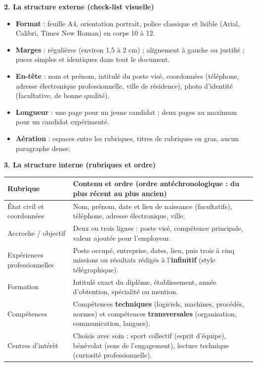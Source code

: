 \documentclass[11pt]{article}
\newcommand{\cle}[1]{{\popxbold\color{popdark}#1}}
\begin{document}
\textbf{2. La structure externe (check-list visuelle)}\par
\begin{itemize}
    \item \textbf{Format} : feuille A4, orientation portrait, police classique et lisible (Arial, Calibri, Times New Roman) en corps 10 à 12.
    \item \textbf{Marges} : régulières (environ 1,5 à 2 cm) ; alignement à gauche ou justifié ; puces simples et identiques dans tout le document.
    \item \textbf{En-tête} : nom et prénom, intitulé du poste visé, coordonnées (téléphone, adresse électronique professionnelle, ville de résidence), photo d'identité (facultative, de bonne qualité).
    \item \textbf{Longueur} : une page pour un jeune candidat ; deux pages au maximum pour un candidat expérimenté.
    \item \textbf{Aération} : espaces entre les rubriques, titres de rubriques en gras, aucun paragraphe dense.
\end{itemize}

\textbf{3. La structure interne (rubriques et ordre)}\par
\begin{center}
\begin{tabularx}{\linewidth}{|l|X|}\hline
\rowcolor{popblueL}
\textbf{Rubrique} & \textbf{Contenu et ordre (ordre antéchronologique : du plus récent au plus ancien)} \\\hline
\cle{État civil et coordonnées} & Nom, prénom, date et lieu de naissance (facultatifs), téléphone, adresse électronique, ville. \\\hline
\cle{Accroche / objectif} & Deux ou trois lignes : poste visé, compétence principale, valeur ajoutée pour l'employeur. \\\hline
\cle{Expériences professionnelles} & Poste occupé, entreprise, dates, lieu, puis trois à cinq missions ou résultats rédigés à l'\textbf{infinitif} (style télégraphique). \\\hline
\cle{Formation} & Intitulé exact du diplôme, établissement, année d'obtention, spécialité ou mention. \\\hline
\cle{Compétences} & Compétences \textbf{techniques} (logiciels, machines, procédés, normes) et compétences \textbf{transversales} (organisation, communication, langues). \\\hline
\cle{Centres d'intérêt} & Choisis avec soin : sport collectif (esprit d'équipe), bénévolat (sens de l'engagement), lecture technique (curiosité professionnelle). \\\hline
\end{tabularx}
\end{center}
\end{document}
